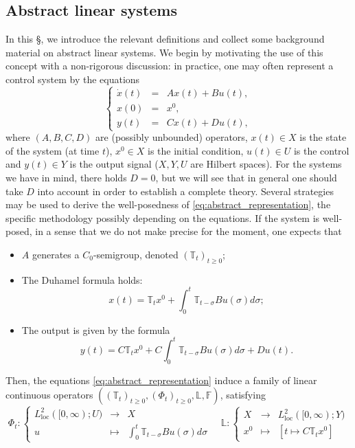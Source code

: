 \documentclass[10pt]{article}
\newcommand{\oploc}{\operatorname{loc}}
\begin{document}
\subsection{Abstract linear systems}
In this \S, we introduce the relevant definitions and collect some background material on abstract linear systems. We begin by motivating the use of this concept with a non-rigorous discussion: in practice, one may often represent a control system by the equations 
\begin{equation}\label{eq:abstract_representation}
    \left\lbrace \begin{array}{rcl}
\dot{x}(t) &=& Ax(t) + Bu(t), \\
x(0) &=& x^0, \\
y(t) &=& Cx(t) + Du(t),
\end{array}\right.
\end{equation}
where $(A,B,C,D)$ are (possibly unbounded) operators, $x(t) \in X$ is the state of the system (at time $t$), $x^0 \in X$ is the initial condition, $u(t) \in U$ is the control and $y(t) \in Y$ is the output signal ($X,Y,U$ are Hilbert spaces). For the systems we have in mind, there holds $D = 0$, but we will see that in general one should take $D$ into account in order to establish a complete theory. Several strategies may be used to derive the well-posedness of \eqref{eq:abstract_representation}, the specific methodology possibly depending on the equations. If the system is well-posed, in a sense that we do not make precise for the moment, one expects that 
\begin{itemize}
    \item $A$ generates a $C_0$-semigroup, denoted $(\mathbb{T}_t)_{t \geq 0}$;
    \item The Duhamel formula holds: 
    \[
    x(t) = \mathbb{T}_t x^0 + \int_0^t \mathbb{T}_{t-\sigma} Bu(\sigma) d\sigma;
    \]
    \item The output is given by the formula 
    \[
    y(t) = C \mathbb{T}_t x^0 + C \int_0^t \mathbb{T}_{t-\sigma} Bu(\sigma) d\sigma + Du(t). 
    \]
\end{itemize}
Then, the equations \eqref{eq:abstract_representation} induce a family of linear continuous operators $((\mathbb{T}_t)_{t \geq 0},(\Phi_t)_{t \geq 0}, \mathbb{L}, \mathbb{F})$, satisfying 
\[
\Phi_t : \left\lbrace \begin{array}{ccc}
    L^2_{\mathrm{loc}}([0,\infty);U) & \longrightarrow & X  \\
    u & \longmapsto &  \int_0^t \mathbb{T}_{t-\sigma} Bu(\sigma) d\sigma
\end{array}\right. \quad 
\mathbb{L} : \left\lbrace \begin{array}{ccc}
    X & \longrightarrow & L_{\oploc}^2([0,\infty);Y)  \\
    x^0 & \longmapsto &  [t \mapsto C \mathbb{T}_t x^0]
\end{array}\right.
\]
\end{document}

